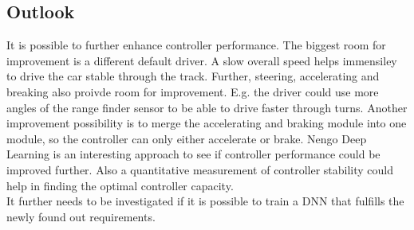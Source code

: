 \documentclass[10pt,a4paper,twoside,journal]{IEEEtran}
\begin{document}
\subsection{Outlook}
\label{ssc:outlook}
It is possible to further enhance controller performance. The biggest room for improvement is a different default driver. A slow overall speed helps immensiley to drive the car stable through the track. Further, steering, accelerating and breaking also proivde room for improvement. E.g. the driver could use more angles of the range finder sensor to be able to drive faster through turns. Another improvement possibility is to merge the accelerating and braking module into one module, so the controller can only either accelerate or brake. Nengo Deep Learning is an interesting approach to see if controller performance could be improved further. Also a quantitative measurement of controller stability could help in finding the optimal controller capacity. \\
It further needs to be investigated if it is possible to train a DNN that fulfills the newly found out requirements.



\end{document}
